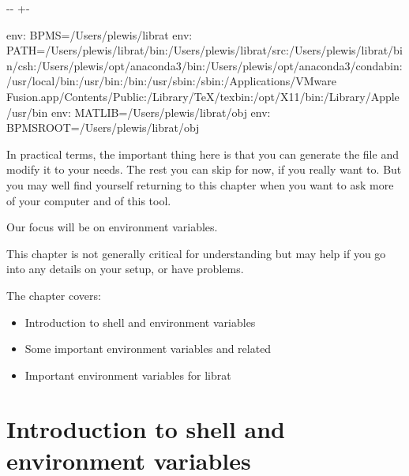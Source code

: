 \documentclass[letterpaper,10pt,english]{sphinxmanual}
\newlength\nbsphinxcodecellspacing
\begin{document}
{

\kern-\sphinxverbatimsmallskipamount\kern-\baselineskip
\kern+\FrameHeightAdjust\kern-\fboxrule
\vspace{\nbsphinxcodecellspacing}

\begin{sphinxVerbatim}[commandchars=\\\{\}]
env: BPMS=/Users/plewis/librat
env: PATH=/Users/plewis/librat/bin:/Users/plewis/librat/src:/Users/plewis/librat/bin/csh:/Users/plewis/opt/anaconda3/bin:/Users/plewis/opt/anaconda3/condabin:/usr/local/bin:/usr/bin:/bin:/usr/sbin:/sbin:/Applications/VMware Fusion.app/Contents/Public:/Library/TeX/texbin:/opt/X11/bin:/Library/Apple/usr/bin
env: MATLIB=/Users/plewis/librat/obj
env: BPMSROOT=/Users/plewis/librat/obj
\end{sphinxVerbatim}
}

In practical terms, the important thing here is that you can generate the file  and modify it to your needs. The rest you can skip for now, if you really want to. But you may well find yourself returning to this chapter when you want to ask more of your computer and of this tool.

Our focus will be on  environment variables.

This chapter is not generally critical for understanding  but may help if you go into any details on your setup, or have problems.

The chapter covers:
\begin{itemize}
\item {} 
Introduction to shell and environment variables

\item {} 
Some important environment variables and related

\item {} 
Important environment variables for librat

\end{itemize}


\section{Introduction to shell and environment variables}
\label{\detokenize{Appendix1:Introduction-to-shell-and-environment-variables}}
\end{document}
